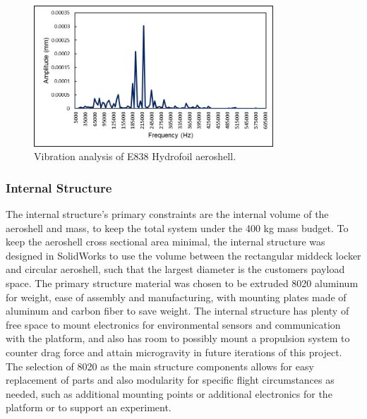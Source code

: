 \begin{figure}[H]
  \centering
  \includegraphics[width=0.8\textwidth]{Aeroshell/vibration.png}
  \caption{\label{fig:vibration}Vibration analysis of E838 Hydrofoil aeroshell.}
\end{figure}


\subsubsection{Internal Structure}

\indent\indent The internal structure's primary constraints are the internal volume of the aeroshell and mass, to keep the total system under the 400 kg mass budget. To keep the aeroshell cross sectional area minimal, the internal structure was designed in SolidWorks to use the volume between the rectangular middeck locker and circular aeroshell, such that the largest diameter is the customers payload space. The primary structure material was chosen to be extruded 8020 aluminum for weight, ease of assembly and manufacturing, with mounting plates made of aluminum and carbon fiber to save weight. The internal structure has plenty of free space to mount electronics for environmental sensors and communication with the platform, and also has room to possibly mount a propulsion system to counter drag force and attain microgravity in future iterations of this project. The selection of 8020 as the main structure components allows for easy replacement of parts and also modularity for specific flight circumstances as needed, such as additional mounting points or additional electronics for the platform or to support an experiment.

